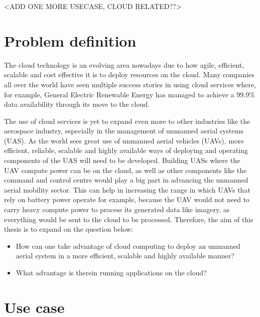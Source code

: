 <ADD ONE MORE USECASE, CLOUD RELATED??>

\section{Problem definition}
\label{sec:problem-definition}
The cloud technology is an evolving area nowadays due to how agile, efficient, scalable and cost effective it is to deploy resources on the cloud. Many companies all over the world have seen multiple success stories in using cloud services where, for example, General Electric Renewable Energy has managed to achieve a 99.9\% data availability through its move to the cloud\cite{awsgerenewableenergy}.

The use of cloud services is yet to expand even more to other industries like the aerospace industry, especially in the management of unmanned aerial systems (UAS). As the world sees great use of unmanned aerial vehicles (UAVs), more efficient, reliable, scalable and highly available ways of deploying and operating components of the UAS will need to be developed. Building UASs where the UAV compute power can be on the cloud, as well as other components like the command and control centre would play a big part in advancing the unmanned aerial mobility sector. This can help in increasing the range in which UAVs that rely on battery power operate for example, because the UAV would not need to carry heavy compute power to process its generated data like imagery, as everything would be sent to the cloud to be processed. Therefore, the aim of this thesis is to expand on the question below:

\begin{itemize}
    \item How can one take advantage of cloud computing to deploy an unmanned aerial system in a more efficient, scalable and highly available manner?
    \item What advantage is therein running applications on the cloud?
\end{itemize}


\section{Use case}
\label{sec:use-case}

